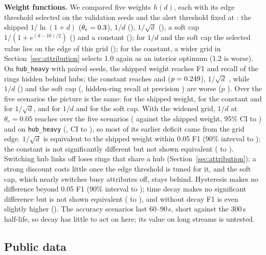 \textbf{Weight functions.} We compared five weights $h(d)$, each with its edge
threshold selected on the validation seeds and the alert threshold fixed at
\TunedAlert{}: the shipped $1/\ln(1+d)$ ($\theta_e=0.3{}$), $1/d$
(\WInvEdge{}), $1/\sqrt{d}$ (\WSqrtEdge{}), a soft cap
$1/(1+e^{(d-10)/2})$ (\WSoftEdge{}) and a constant (\WConstEdge{}); for $1/d$ and the soft cap the selected value lies on the edge of this grid
(\RfGridNote{}); for the constant, a wider grid in Section~\ref{sec:attribution}
selects 1.0 again as an interior optimum (1.2 is worse).
On \texttt{hub\_heavy} with \WbSeeds{} paired seeds, the shipped weight reaches
F1 \WbShipF{} and recall \WbShipHH{} of the rings hidden behind hubs; the
constant reaches \WbConstF{} and \WbConstHH{} ($p=0.249{}$), $1/\sqrt{d}$
\WbSqrtF{}, while $1/d$ (\WbInvF{}) and the soft cap (\WbSoftF{}, hidden-ring
recall \WbSoftHH{} at precision \WbSoftP{}) are worse ($p$ \WbSoftPval{}). Over
the five scenarios the picture is the same: \WcShipF{} for the shipped weight,
\WcConstF{} for the constant and \WcSqrtF{} for $1/\sqrt{d}$, and \WcInvF{} for
$1/d$ and \WcSoftF{} for the soft cap. With the widened grid, $1/d$ at
$\theta_e=0.05$ reaches \RfInvFiveF{} over the five scenarios (\RfInvFiveD{}
against the shipped weight, 95\% CI \RfInvFiveLo{} to \RfInvFiveHi{}) and
\RfInvHubF{} on \texttt{hub\_heavy} (\RfInvHubD{}, CI \RfInvHubLo{} to
\RfInvHubHi{}), so most of its earlier deficit came from the grid edge.
$1/\sqrt{d}$ is equivalent to the shipped
weight within 0.05 F1 (90\% interval \RfWSqrtLo{} to \RfWSqrtHi{}); the constant
is not significantly different but not shown equivalent (\RfWConstLo{} to
\RfWConstHi{}). Switching hub links off loses rings that share a hub
(Section~\ref{sec:attribution}); a strong discount costs little once the edge
threshold is tuned for it, and the soft cap, which nearly switches busy
attributes off, stays behind.
Hysteresis makes no difference beyond 0.05 F1 (90\% interval \RfAblHystLo{} to
\RfAblHystHi{}); time decay makes no significant difference but is not shown
equivalent (\RfAblDecayLo{} to \RfAblDecayHi{}), and without decay F1 is even
slightly higher (\AblNoTimeDecayF{}). The accuracy scenarios last
60--90\,s, short against the 300\,s half-life, so decay has little to act on
here; its value on long streams is untested.

\subsection{Public data}
\label{sec:public}


